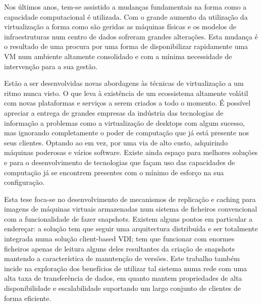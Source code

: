 
Nos últimos anos, tem-se assistido a mudanças fundamentais na forma como a capacidade computacional é utilizada. Com o grande aumento da utilização da virtualização a forma como são geridas as máquinas físicas e os modelos de infraestruturas num centro de dados sofreram grandes alterações. Esta mudança é o resultado de uma procura por uma forma de disponibilizar rapidamente uma VM num ambiente altamente consolidado e com a mínima necessidade de intervenção para a sua gestão.

Estão a ser desenvolvidas novas abordagens às técnicas de virtualização a um ritmo nunca visto. O que leva à existência de um ecossistema altamente volátil com novas plataformas e serviços a serem criados a todo o momento. É possível apreciar a entrega de grandes empresas da indústria  das tecnologias de informação a problemas como a virtualização de desktops com algum sucesso, mas ignorando completamente o poder de computação que já está presente nos seus clientes. Optando ao em vez, por uma via de alto custo, adquirindo máquinas poderosas e vários software. Existe ainda espaço para melhores soluções e para o desenvolvimento de tecnologias que façam uso das capacidades de computação já se encontrem presentes com o mínimo de esforço na sua configuração.

Esta tese foca-se no desenvolvimento de mecanismos de replicação e caching para imagens de máquinas virtuais armazenadas num sistema de ficheiros convencional com a funcionalidade de fazer snapshots. Existem alguns pontos em particular a endereçar: a solução tem que seguir uma arquitectura distribuída e ser totalmente integrada numa solução client-based VDI; tem que funcionar com enormes ficheiros apenas de leitura alguns deles resultantes da criação de snapshots mantendo a característica de manutenção de versões. Este trabalho também incide na exploração dos benefícios de utilizar tal sistema numa rede com uma alta taxa de transferência de dados, em quanto mantem propriedades de alta disponibilidade e escalabilidade suportando um largo conjunto de clientes de forma eficiente.


